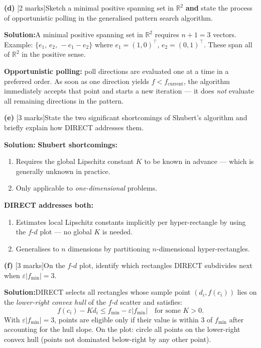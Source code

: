 \documentclass[10pt,a4paper]{article}
\newcommand{\Sol}{\par\vspace{4pt}\noindent\textbf{Solution:}\enspace}
\begin{document}
\vspace{4pt}
\noindent\textbf{(d)} [2 marks]\quad Sketch a minimal positive spanning set in
$\mathbb{R}^2$ \textbf{and} state the process of opportunistic polling in the
generalised pattern search algorithm.

\Sol A minimal positive spanning set in $\mathbb{R}^2$ requires $n+1=3$ vectors.
Example: $\{e_1,\, e_2,\, -e_1-e_2\}$ where $e_1=(1,0)^\top$,
$e_2=(0,1)^\top$. These span all of $\mathbb{R}^2$ in the positive sense.

\textbf{Opportunistic polling:} poll directions are evaluated one at a time in a
preferred order. As soon as one direction yields $f < f_{\text{current}}$, the
algorithm immediately accepts that point and starts a new iteration --- it does
\emph{not} evaluate all remaining directions in the pattern.

\vspace{4pt}
\noindent\textbf{(e)} [3 marks]\quad State the two significant shortcomings of
Shubert's algorithm and briefly explain how DIRECT addresses them.

\Sol
\textbf{Shubert shortcomings:}
\begin{enumerate}[noitemsep, topsep=2pt]
  \item Requires the global Lipschitz constant $K$ to be known in advance ---
        which is generally unknown in practice.
  \item Only applicable to \emph{one-dimensional} problems.
\end{enumerate}

\textbf{DIRECT addresses both:}
\begin{enumerate}[noitemsep, topsep=2pt]
  \item Estimates local Lipschitz constants implicitly per hyper-rectangle by
        using the $f$-$d$ plot --- no global $K$ is needed.
  \item Generalises to $n$ dimensions by partitioning $n$-dimensional
        hyper-rectangles.
\end{enumerate}

\vspace{4pt}
\noindent\textbf{(f)} [3 marks]\quad On the $f$-$d$ plot, identify which
rectangles DIRECT subdivides next when $\varepsilon|f_{\min}|=3$.

\Sol DIRECT selects all rectangles whose sample point $(d_i, f(c_i))$ lies on
the \emph{lower-right convex hull} of the $f$-$d$ scatter and satisfies:
\[
  f(c_i) - K d_i \leq f_{\min} - \varepsilon|f_{\min}| \quad \text{for some } K > 0.
\]
With $\varepsilon|f_{\min}|=3$, points are eligible only if their value is within
3 of $f_{\min}$ after accounting for the hull slope. On the plot: circle all
points on the lower-right convex hull (points not dominated below-right by any
other point).
\end{document}
